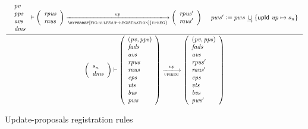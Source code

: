 \begin{figure}[htb]
  \begin{equation}
    \label{eq:rule:upi-reg-interface}
    \inference
    {
      {
        \begin{array}{l}
          \var{pv}\\
          \var{pps}\\
          \var{avs}\\
          \var{dms}
        \end{array}
      }
      \vdash
      {
        \left(
          \begin{array}{l}
            \var{rpus}\\
            \var{raus}
          \end{array}
        \right)
      }
      \trans{\hyperref[fig:rules:up-registration]{upreg}}{\var{up}}
      {
        \left(
          \begin{array}{l}
            \var{rpus'}\\
            \var{raus'}
          \end{array}
        \right)
      }
      &
      pws' \leteq pws \unionoverrideRight \{ \upId{up} \mapsto s_n\}
    }
    {
      {\left(
        \begin{array}{l}
          s_n\\
          \var{dms}
        \end{array}
      \right)}
      \vdash
      {
        \left(
          \begin{array}{l}
            (\var{pv}, \var{pps})\\
            \var{fads}\\
            \var{avs}\\
            \var{rpus}\\
            \var{raus}\\
            \var{cps}\\
            \var{vts}\\
            \var{bvs}\\
            \var{pws}
          \end{array}
        \right)
      }
      \trans{upireg}{\var{up}}
      {
        \left(
          \begin{array}{l}
            (\var{pv}, \var{pps})\\
            \var{fads}\\
            \var{avs}\\
            \var{rpus'}\\
            \var{raus'}\\
            \var{cps}\\
            \var{vts}\\
            \var{bvs}\\
            \var{pws'}
          \end{array}
        \right)
      }
    }
  \end{equation}
  \caption{Update-proposals registration rules}
  \label{fig:rules:upi-reg-interface}
\end{figure}

